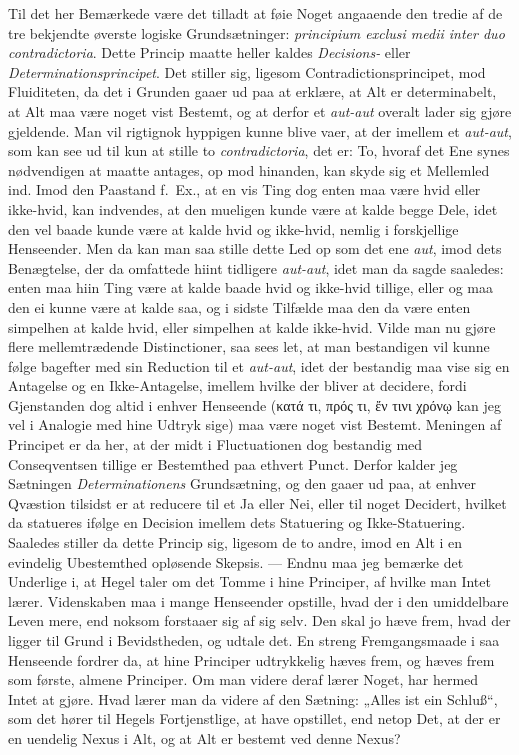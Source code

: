 \documentclass[12pt,a4paper]{book}
\newcommand{\apage}[1]{\marginnote{\footnotesize\textit{[#1]}}}
\begin{document}
Til det her Bemærkede være det tilladt at føie Noget angaaende den tredie
af de tre bekjendte øverste logiske Grundsætninger: \textit{principium
exclusi medii inter duo contradictoria}. Dette Princip maatte heller kaldes
\emph{Decisions-} eller \emph{Determinationsprincipet}. Det stiller sig, ligesom
Contradictionsprincipet, mod Fluiditeten, da det i Grunden gaaer ud paa at
erklære, at Alt er determinabelt, at Alt maa være noget vist Bestemt, og at
\apage{87} derfor et \textit{aut-aut} overalt lader sig gjøre gjeldende. Man vil
rigtignok hyppigen kunne blive vaer, at der imellem et \textit{aut-aut},
som kan see ud til kun at stille to \textit{contradictoria}, det er: To,
hvoraf det Ene synes nødvendigen at maatte antages, op mod hinanden, kan
skyde sig et Mellemled ind. Imod den Paastand f.\ Ex., at en vis Ting dog
enten maa være hvid eller ikke-hvid, kan indvendes, at den mueligen kunde
være at kalde begge Dele, idet den vel baade kunde være at kalde hvid og
ikke-hvid, nemlig i forskjellige Henseender. Men da kan man saa stille
dette Led op som det ene \textit{aut}, imod dets Benægtelse, der da
omfattede hiint tidligere \textit{aut-aut}, idet man da sagde saaledes:
enten maa hiin Ting være at kalde baade hvid og ikke-hvid tillige, eller og
maa den ei kunne være at kalde saa, og i sidste Tilfælde maa den da være
enten simpelhen at kalde hvid, eller simpelhen at kalde ikke-hvid. Vilde
man nu gjøre flere mellemtrædende Distinctioner, saa sees let, at man
bestandigen vil kunne følge bagefter med sin Reduction til et
\textit{aut-aut}, idet der bestandig maa vise sig en Antagelse og en
Ikke-Antagelse, imellem hvilke der bliver at decidere, fordi Gjenstanden
dog altid i enhver Henseende (κατά τι, πρός τι, ἔν τινι χρόνῳ kan jeg vel i
Analogie med hine Udtryk sige) maa være noget vist Bestemt. Meningen af
Principet er da her, at der midt i Fluctuationen dog bestandig med
Conseqventsen tillige er Bestemthed paa ethvert Punct. Derfor kalder jeg
Sætningen \emph{Determinationens} Grundsætning, og den gaaer ud paa, at enhver
Qvæstion tilsidst er at reducere til et Ja eller Nei, eller til noget
Decidert, hvilket da statueres ifølge en Decision imellem dets Statuering
og Ikke-Statuering. Saaledes stiller da dette Princip sig, ligesom de to
andre, imod en Alt i en evindelig Ubestemthed opløsende Skepsis. --- Endnu
maa jeg bemærke det Underlige i, at Hegel taler om det Tomme i hine
Principer, af hvilke man Intet lærer. Videnskaben maa i mange Henseender
opstille, hvad der i den umiddelbare Leven mere, end \apage{88} noksom forstaaer sig
af sig selv. Den skal jo hæve frem, hvad der ligger til Grund i
Bevidstheden, og udtale det. En streng Fremgangsmaade i saa Henseende
fordrer da, at hine Principer udtrykkelig hæves frem, og hæves frem som
første, almene Principer. Om man videre deraf lærer Noget, har hermed Intet
at gjøre. Hvad lærer man da videre af den Sætning: „Alles ist ein Schluß“,
som det hører til Hegels Fortjenstlige, at have opstillet, end netop Det,
at der er en uendelig Nexus i Alt, og at Alt er bestemt ved denne Nexus?
\end{document}
